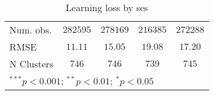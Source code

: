 \begin{table}
\begin{center}
\begin{tabular}{l c c c c}
Num. obs.                   & $282595$      & $278169$      & $216385$      & $272288$      \\
RMSE                        & $11.11$       & $15.05$       & $19.08$       & $17.20$       \\
N Clusters                  & $746$         & $746$         & $739$         & $745$         \\
\hline
\multicolumn{5}{l}{\scriptsize{$^{***}p<0.001$; $^{**}p<0.01$; $^{*}p<0.05$}}
\end{tabular}
\caption{Learning loss by ses}
\label{tableses}
\end{center}
\end{table}
